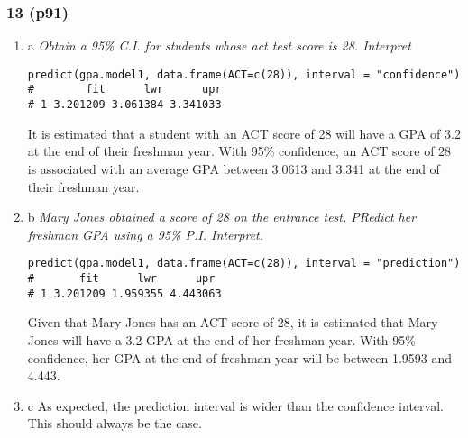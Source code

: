 \documentclass[11pt]{article}
\begin{document}
\subsubsection{13 (p91)}
\label{sec:org70e5228}
\begin{enumerate}
\item a
\label{sec:org64f15fb}
\emph{Obtain a 95\% C.I. for students whose act test score is 28. Interpret}

\begin{verbatim}
predict(gpa.model1, data.frame(ACT=c(28)), interval = "confidence")
#        fit      lwr      upr
# 1 3.201209 3.061384 3.341033
\end{verbatim}

It is estimated that a student with an ACT score of 28 will have a GPA of 3.2 at
the end of their freshman year. With 95\% confidence, an ACT score of 28 is
associated with an average GPA between 3.0613 and 3.341 at the end of their freshman year.
\item b
\label{sec:org0f71e03}
\emph{Mary Jones obtained a score of 28 on the entrance test. PRedict her freshman
GPA using a 95\% P.I. Interpret.}

\begin{verbatim}
predict(gpa.model1, data.frame(ACT=c(28)), interval = "prediction")
#       fit      lwr      upr
# 1 3.201209 1.959355 4.443063
\end{verbatim}

Given that Mary Jones has an ACT score of 28, it is estimated that Mary Jones
will have a 3.2 GPA at the end of her freshman year. With 95\% confidence, her GPA
at the end of freshman year will be between 1.9593 and 4.443.
\item c
\label{sec:org5140d70}
As expected, the prediction interval is wider than the confidence interval. This
should always be the case.
\end{enumerate}
\end{document}
